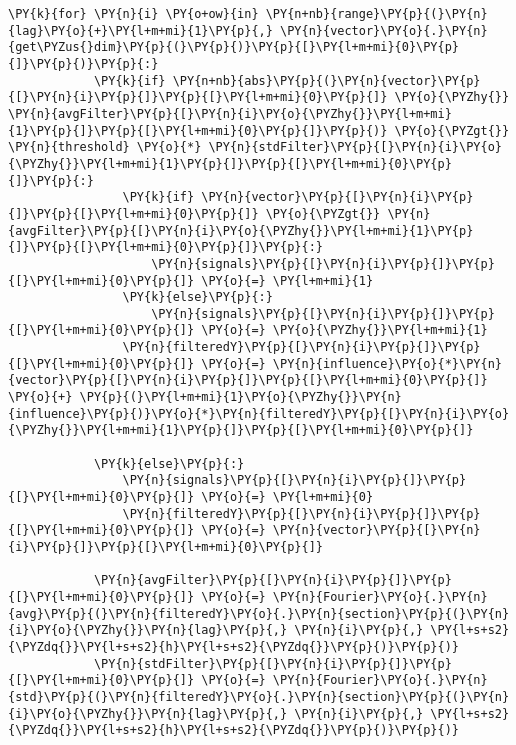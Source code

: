 \begin{Verbatim}[commandchars=\\\{\}]
        \PY{k}{for} \PY{n}{i} \PY{o+ow}{in} \PY{n+nb}{range}\PY{p}{(}\PY{n}{lag}\PY{o}{+}\PY{l+m+mi}{1}\PY{p}{,} \PY{n}{vector}\PY{o}{.}\PY{n}{get\PYZus{}dim}\PY{p}{(}\PY{p}{)}\PY{p}{[}\PY{l+m+mi}{0}\PY{p}{]}\PY{p}{)}\PY{p}{:}
            \PY{k}{if} \PY{n+nb}{abs}\PY{p}{(}\PY{n}{vector}\PY{p}{[}\PY{n}{i}\PY{p}{]}\PY{p}{[}\PY{l+m+mi}{0}\PY{p}{]} \PY{o}{\PYZhy{}} \PY{n}{avgFilter}\PY{p}{[}\PY{n}{i}\PY{o}{\PYZhy{}}\PY{l+m+mi}{1}\PY{p}{]}\PY{p}{[}\PY{l+m+mi}{0}\PY{p}{]}\PY{p}{)} \PY{o}{\PYZgt{}} \PY{n}{threshold} \PY{o}{*} \PY{n}{stdFilter}\PY{p}{[}\PY{n}{i}\PY{o}{\PYZhy{}}\PY{l+m+mi}{1}\PY{p}{]}\PY{p}{[}\PY{l+m+mi}{0}\PY{p}{]}\PY{p}{:}
                \PY{k}{if} \PY{n}{vector}\PY{p}{[}\PY{n}{i}\PY{p}{]}\PY{p}{[}\PY{l+m+mi}{0}\PY{p}{]} \PY{o}{\PYZgt{}} \PY{n}{avgFilter}\PY{p}{[}\PY{n}{i}\PY{o}{\PYZhy{}}\PY{l+m+mi}{1}\PY{p}{]}\PY{p}{[}\PY{l+m+mi}{0}\PY{p}{]}\PY{p}{:}
                    \PY{n}{signals}\PY{p}{[}\PY{n}{i}\PY{p}{]}\PY{p}{[}\PY{l+m+mi}{0}\PY{p}{]} \PY{o}{=} \PY{l+m+mi}{1}
                \PY{k}{else}\PY{p}{:}
                    \PY{n}{signals}\PY{p}{[}\PY{n}{i}\PY{p}{]}\PY{p}{[}\PY{l+m+mi}{0}\PY{p}{]} \PY{o}{=} \PY{o}{\PYZhy{}}\PY{l+m+mi}{1}
                \PY{n}{filteredY}\PY{p}{[}\PY{n}{i}\PY{p}{]}\PY{p}{[}\PY{l+m+mi}{0}\PY{p}{]} \PY{o}{=} \PY{n}{influence}\PY{o}{*}\PY{n}{vector}\PY{p}{[}\PY{n}{i}\PY{p}{]}\PY{p}{[}\PY{l+m+mi}{0}\PY{p}{]} \PY{o}{+} \PY{p}{(}\PY{l+m+mi}{1}\PY{o}{\PYZhy{}}\PY{n}{influence}\PY{p}{)}\PY{o}{*}\PY{n}{filteredY}\PY{p}{[}\PY{n}{i}\PY{o}{\PYZhy{}}\PY{l+m+mi}{1}\PY{p}{]}\PY{p}{[}\PY{l+m+mi}{0}\PY{p}{]}
                
            \PY{k}{else}\PY{p}{:}
                \PY{n}{signals}\PY{p}{[}\PY{n}{i}\PY{p}{]}\PY{p}{[}\PY{l+m+mi}{0}\PY{p}{]} \PY{o}{=} \PY{l+m+mi}{0}
                \PY{n}{filteredY}\PY{p}{[}\PY{n}{i}\PY{p}{]}\PY{p}{[}\PY{l+m+mi}{0}\PY{p}{]} \PY{o}{=} \PY{n}{vector}\PY{p}{[}\PY{n}{i}\PY{p}{]}\PY{p}{[}\PY{l+m+mi}{0}\PY{p}{]}
            
            \PY{n}{avgFilter}\PY{p}{[}\PY{n}{i}\PY{p}{]}\PY{p}{[}\PY{l+m+mi}{0}\PY{p}{]} \PY{o}{=} \PY{n}{Fourier}\PY{o}{.}\PY{n}{avg}\PY{p}{(}\PY{n}{filteredY}\PY{o}{.}\PY{n}{section}\PY{p}{(}\PY{n}{i}\PY{o}{\PYZhy{}}\PY{n}{lag}\PY{p}{,} \PY{n}{i}\PY{p}{,} \PY{l+s+s2}{\PYZdq{}}\PY{l+s+s2}{h}\PY{l+s+s2}{\PYZdq{}}\PY{p}{)}\PY{p}{)}
            \PY{n}{stdFilter}\PY{p}{[}\PY{n}{i}\PY{p}{]}\PY{p}{[}\PY{l+m+mi}{0}\PY{p}{]} \PY{o}{=} \PY{n}{Fourier}\PY{o}{.}\PY{n}{std}\PY{p}{(}\PY{n}{filteredY}\PY{o}{.}\PY{n}{section}\PY{p}{(}\PY{n}{i}\PY{o}{\PYZhy{}}\PY{n}{lag}\PY{p}{,} \PY{n}{i}\PY{p}{,} \PY{l+s+s2}{\PYZdq{}}\PY{l+s+s2}{h}\PY{l+s+s2}{\PYZdq{}}\PY{p}{)}\PY{p}{)}
        

\end{Verbatim}
